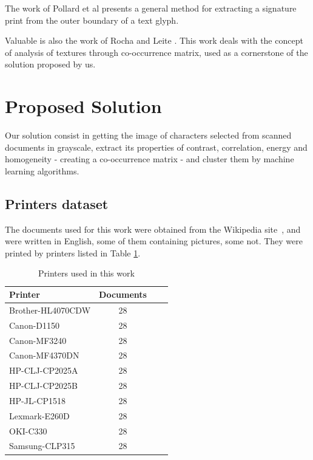 \documentclass[10pt,twocolumn,letterpaper]{article}
\begin{document}
The work of Pollard et al \cite{Pollard} presents a general method for extracting a signature print from the outer boundary of a text glyph.

Valuable is also the work of Rocha and Leite \cite{Rocha}. This work deals with the concept of analysis of textures through co-occurrence matrix, used as a cornerstone of the solution proposed by us.

\section{Proposed Solution}
\label{sec:proposed_solution}

Our solution consist in getting the image of characters selected from scanned documents in grayscale, extract its properties of contrast, correlation, energy and homogeneity - creating a co-occurrence matrix - and cluster them by machine learning algorithms.

\subsection{Printers dataset}
\label{subsec:printers_dataset}

The documents used for this work were obtained from the Wikipedia site~\cite{Wikipedia}, and were written in English, some of them containing pictures, some not. They were printed by printers listed in Table \ref{tab:printers}. 

\begin{table}
\label{tab:printers}
\caption{Printers used in this work}
\begin{center}
\begin{tabular}{l*{2}{c}r}
Printer           & Documents \\
\hline
Brother-HL4070CDW & 28 \\
Canon-D1150 & 28 \\
Canon-MF3240 & 28 \\
Canon-MF4370DN & 28 \\
HP-CLJ-CP2025A & 28 \\
HP-CLJ-CP2025B & 28 \\
HP-JL-CP1518 & 28 \\
Lexmark-E260D & 28 \\
OKI-C330 & 28 \\
Samsung-CLP315 & 28 \\
\end{tabular}
\end{center}
\end{table}
\end{document}
